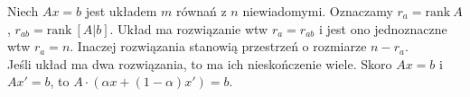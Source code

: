 \begin{theorem} 
Niech \( Ax = b \) jest układem \( m \) równań z \( n \) niewiadomymi. Oznaczamy \( r_{a} = \text{rank}\: A \), \( r_{ab} = \text{rank}\: [A|b] \). Układ ma rozwiązanie wtw \( r_{a} = r_{ab} \) i jest ono jednoznaczne wtw \( r_{a} = n \). Inaczej rozwiązania stanowią przestrzeń \linebreak o rozmiarze \( n - r_{a} \). \\
Jeśli układ ma dwa rozwiązania, to ma ich nieskończenie wiele. Skoro \( Ax = b \) i \( Ax' = b \), \linebreak to \( A \cdot (\alpha x + (1 - \alpha)x') = b \).
\end{theorem} \\